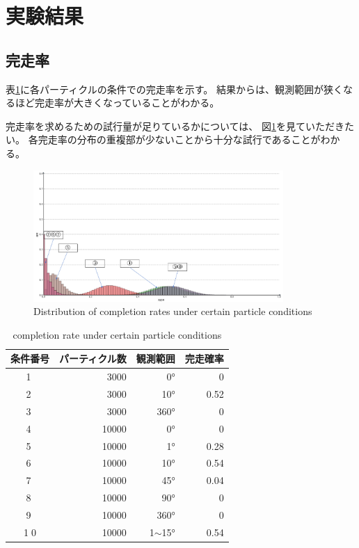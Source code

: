 \documentclass{jarticle}
\begin{document}
\section{実験結果}%

\subsection{完走率}

表\ref{table:完走率}に各パーティクルの条件での完走率を示す。
結果からは、観測範囲が狭くなるほど完走率が大きくなっていることがわかる。

完走率を求めるための試行量が足りているかについては、
図\ref{fig: 完走率の分布}を見ていただきたい。
各完走率の分布の重複部が少ないことから十分な試行であることがわかる。

\begin{figure}[h!]
  \centering
   \includegraphics[height=50mm]{fig/kansouritsu.png}
   \vspace*{-4mm}
   \caption{Distribution of completion rates under certain particle conditions}
   \label{fig: 完走率の分布}
\end{figure}

\begin{table}[htbp]
  \caption{completion rate under certain particle conditions}
  \label{table:完走率}
  \begin{tabular}{|c|r|r|r|} \hline
  条件番号 & パーティクル数 & 観測範囲  & 完走確率 \\ \hline \hline
  \textcircled{\scriptsize 1} & 3000 & 0° & 0 \\ \hline
  \textcircled{\scriptsize 2} & 3000 & 10° & 0.52 \\ \hline
  \textcircled{\scriptsize 3} & 3000 & 360° & 0 \\ \hline
  \textcircled{\scriptsize 4} & 10000 & 0° & 0 \\ \hline
  \textcircled{\scriptsize 5} & 10000 & 1° & 0.28 \\ \hline
  \textcircled{\scriptsize 6} & 10000 & 10° & 0.54 \\ \hline
  \textcircled{\scriptsize 7} & 10000 & 45° & 0.04 \\ \hline
  \textcircled{\scriptsize 8} & 10000 & 90° & 0 \\ \hline
  \textcircled{\scriptsize 9} & 10000 & 360° & 0 \\ \hline
  \textcircled{\scriptsize 10} & 10000 & 1$\sim$15° & 0.54 \\ \hline
  \end{tabular}
\end{table}
\end{document}
